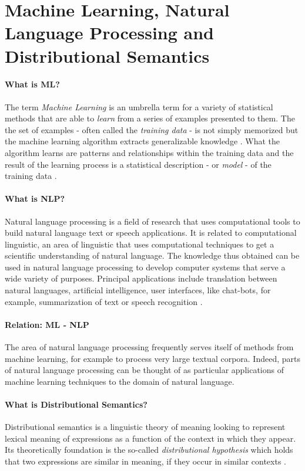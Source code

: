\documentclass{article}
\begin{document}
\section{Machine Learning, Natural Language Processing and Distributional Semantics}\hypertarget{sec3}{ }
\paragraph{What is ML?}
The term \emph{Machine Learning} is an umbrella term for a variety of statistical methods that are able to \emph{learn} from a series of examples presented to them. The the set of examples - often called the \emph{training data} - is not simply memorized but the machine learning algorithm extracts generalizable knowledge \cite{domingos2012few}.
 What the algorithm learns are patterns and relationships within the training data and the result of the learning process is a statistical description - or \emph{model} - of the training data \cite{fayyad2001digital}.
\paragraph{What is NLP?}
Natural language processing is a field of research that uses computational tools to build natural language text or speech applications. It is related to computational linguistic, an area of linguistic that uses computational techniques to get a scientific understanding of natural language. The knowledge thus obtained can be used in natural language processing to develop computer systems that serve a wide variety of purposes. Principal applications include translation between natural languages, artificial intelligence, user interfaces, like chat-bots, for example, summarization of text or speech recognition \cite{chowdhury2003natural}.
\paragraph{Relation: ML - NLP}
The area of natural language processing frequently serves itself of methods from machine learning, for example to process very large textual corpora. Indeed, parts of natural language processing can be thought of as particular applications of machine learning techniques to the domain of natural language.
\paragraph{What is Distributional Semantics?}
Distributional semantics is a linguistic theory of meaning looking to represent lexical meaning of expressions as a function of the context in which they appear. Its theoretically foundation is the so-called \emph{distributional hypothesis} which holds that two expressions are similar in meaning, if they occur in similar contexts \cite{harris1954distributional}.
\end{document}
